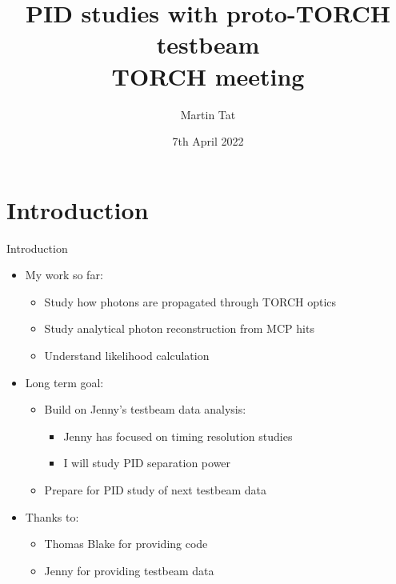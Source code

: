 \documentclass{beamer}
\title[TORCH meeting]{PID studies with proto-TORCH testbeam \\TORCH meeting}
\author{Martin Tat}
\institute{University of Oxford}
\date{7th April 2022}
\begin{document}
\begin{frame}
  \titlepage
\end{frame}


\section{Introduction}
\begin{frame}{Introduction}
  \begin{itemize}
    \setlength\itemsep{2.0em}
    \item{My work so far:}
    \begin{itemize}
    \setlength\itemsep{0.5em}
      \item{Study how photons are propagated through TORCH optics}
      \item{Study analytical photon reconstruction from MCP hits}
      \item{Understand likelihood calculation}
    \end{itemize}
    \item{Long term goal:}
    \begin{itemize}
    \setlength\itemsep{0.5em}
      \item{Build on Jenny's testbeam data analysis:}
      \begin{itemize}
        \item{Jenny has focused on timing resolution studies}
        \item{I will study PID separation power}
      \end{itemize}
      \item{Prepare for PID study of next testbeam data}
    \end{itemize}
    \item{Thanks to:}
    \begin{itemize}
      \item{Thomas Blake for providing code}
      \item{Jenny for providing testbeam data}
    \end{itemize}
  \end{itemize}
\end{frame}
\end{document}

